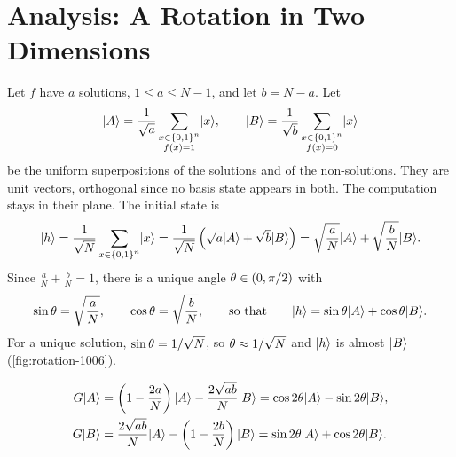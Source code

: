 \section{Analysis: A Rotation in Two Dimensions}\label{sec:grover-analysis-1006}

Let $f$ have $a$ solutions, $1 \leq a \leq N - 1$, and let $b = N - a$. Let
\[\lvert A \rangle = \frac{1}{\sqrt{a}} \sum_{\substack{x \in \left\lbrace0,1\right\rbrace^n \\ f(x) = 1}} \lvert x \rangle,
    \qquad
    \lvert B \rangle = \frac{1}{\sqrt{b}} \sum_{\substack{x \in \left\lbrace0,1\right\rbrace^n \\ f(x) = 0}} \lvert x \rangle\]
be the uniform superpositions of the solutions and of the non-solutions. They are unit vectors,
orthogonal since no basis state appears in both. The computation stays in their plane. The initial
state is
\begin{equation}\label{eq:h-AB-1006}
    \lvert h \rangle = \frac{1}{\sqrt{N}} \sum_{x \in \left\lbrace0,1\right\rbrace^n} \lvert x \rangle
    = \frac{1}{\sqrt{N}} \left(\sqrt{a} \lvert A \rangle + \sqrt{b} \lvert B \rangle\right)
    = \sqrt{\frac{a}{N}} \lvert A \rangle + \sqrt{\frac{b}{N}} \lvert B \rangle.
\end{equation}
Since $\frac{a}{N} + \frac{b}{N} = 1$, there is a unique angle $\theta \in (0, \pi/2)$ with
\[\sin\theta = \sqrt{\frac{a}{N}}, \qquad \cos\theta = \sqrt{\frac{b}{N}},
    \qquad \text{so that} \qquad \lvert h \rangle = \sin\theta \lvert A \rangle + \cos\theta \lvert B \rangle.\]
For a unique solution, $\sin\theta = 1/\sqrt{N}$, so $\theta \approx 1/\sqrt{N}$ and
$\lvert h \rangle$ is almost $\lvert B \rangle$ (\cref{fig:rotation-1006}).

\begin{lemma}\label{lem:giter-1006}
    \begin{align*}
        G\lvert A \rangle & = \left(1 - \frac{2a}{N}\right)\lvert A \rangle - \frac{2\sqrt{ab}}{N}\lvert B \rangle
        = \cos 2\theta \lvert A \rangle - \sin 2\theta \lvert B \rangle,                                 \\
        G\lvert B \rangle & = \frac{2\sqrt{ab}}{N}\lvert A \rangle - \left(1 - \frac{2b}{N}\right)\lvert B \rangle
        = \sin 2\theta \lvert A \rangle + \cos 2\theta \lvert B \rangle.
    \end{align*}
\end{lemma}

